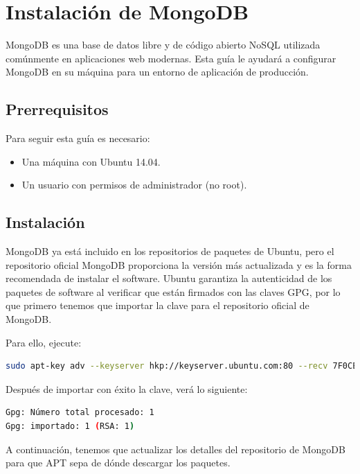 \section{Instalación de MongoDB}

MongoDB es una base de datos libre y de código abierto NoSQL utilizada comúnmente en aplicaciones web modernas. Esta guía le ayudará a configurar MongoDB en su máquina para un entorno de aplicación de producción.\\

\subsection{Prerrequisitos}

Para seguir esta guía es necesario:
\begin{itemize}

\item{Una máquina con Ubuntu 14.04.}
\item{Un usuario con permisos de administrador (no root).}
\end{itemize}

\subsection{Instalación}


MongoDB ya está incluido en los repositorios de paquetes de Ubuntu, pero el repositorio oficial MongoDB proporciona la versión más actualizada y es la forma recomendada de instalar el software. Ubuntu garantiza la autenticidad de los paquetes de software al verificar que están firmados con las claves GPG, por lo que primero tenemos que importar la clave para el repositorio oficial de MongoDB.

Para ello, ejecute:

\begin{lstlisting}[language=bash]
sudo apt-key adv --keyserver hkp://keyserver.ubuntu.com:80 --recv 7F0CEB10
\end{lstlisting}


Después de importar con éxito la clave, verá lo siguiente:

\begin{lstlisting}[language=bash]
Gpg: Número total procesado: 1
Gpg: importado: 1 (RSA: 1)
\end{lstlisting}

A continuación, tenemos que actualizar los detalles del repositorio de MongoDB para que APT sepa de dónde descargar los paquetes.

